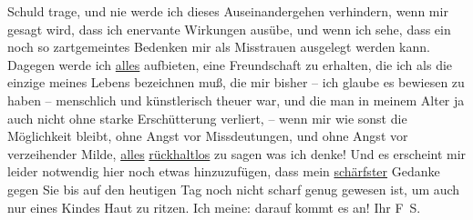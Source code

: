 \begin{ledgroupsized}[t]{13cm}
               Schuld trage, und nie werde ich dieses Auseinandergehen verhindern, wenn mir gesagt
               wird, dass ich enervante Wirkungen ausübe, und wenn ich sehe, dass ein noch so
               zartgemeintes Bedenken mir als Misstrauen ausgelegt werden kann. Dagegen werde ich
                  \uline{alles} aufbieten, eine Freundschaft zu erhalten,
               die ich als die einzige meines Lebens bezeichnen muß, die mir bisher – ich glaube es
               bewiesen zu haben – menschlich und künstlerisch theuer war, und die man in meinem
               Alter ja auch nicht ohne starke Erschütterung verliert, – wenn mir wie sonst die
               Möglichkeit bleibt, ohne Angst vor Missdeutungen, und ohne Angst vor verzeihender
               Milde, \uline{alles}{ }\uline{rückhaltlos} zu sagen was ich denke! Und es erscheint
               mir leider notwendig hier noch etwas hinzuzufügen, dass mein \uline{schärfster} Gedanke \introOben{}gegen Sie\introOben{} bis auf den
               heutigen Tag noch nicht scharf genug gewesen ist, um auch nur eines Kindes Haut zu
               ritzen. Ich meine: darauf kommt es an!\pend
           \pstart Ihr \spacefill\mbox{F S.}\pend{}
         
         \endnumbering{}\end{ledgroupsized}  \newcommand{\dateiname}{L03355}\newcommand{\titel}{Felix Salten an Arthur Schnitzler, [11. 11. 1903]}\newcommand{\editorInnen}{Martin Anton Müller und Laura Untner}
      